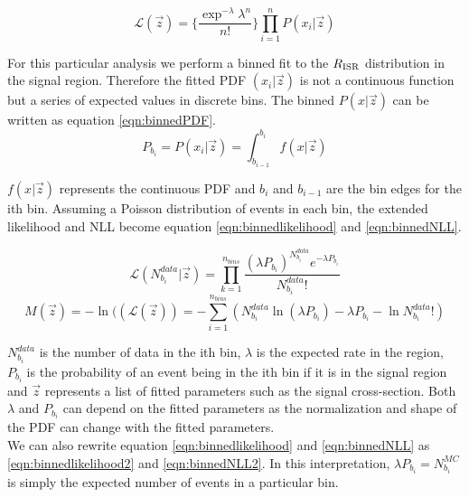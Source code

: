 \begin{equation}
\label{eqn:ExtLikelihood}
{\mathcal{L}}(\vec{z}) = \{ \frac{\exp^{-\lambda}{\lambda}^n}{n!} \}  {\displaystyle\prod_{i=1}^{n}} P(x_i|\vec{z})
\end{equation}

\indent For this particular analysis we perform a binned fit to the $R_{\mathrm{ISR}}$ distribution in the signal region.  Therefore the fitted PDF $(x_i|\vec{z})$ is not a continuous function but a series of expected values in discrete bins.  The binned $P(x|\vec{z})$ can be written as equation \ref{eqn:binnedPDF}. \\

\begin{equation}
\label{eqn:binnedPDF}
P_{b_i} = P(x_i|\vec{z}) = \int^{b_i}_{b_{i-1}} f(x|\vec{z})
\end{equation}

\indent $f(x|\vec{z})$ represents the continuous PDF and $b_i$ and $b_{i-1} $ are the bin edges for the ith bin. Assuming a Poisson distribution of events in each bin, the extended likelihood and NLL become equation \ref{eqn:binnedlikelihood} and \ref{eqn:binnedNLL}.

\begin{equation}
\label{eqn:binnedlikelihood}
{\mathcal{L}}(N^{data}_{b_i}|\vec{z}) = {\displaystyle\prod_{k=1}^{n_{bins}} \frac{({\lambda}P_{b_i})^{N^{data}_{b_i}}e^{-{\lambda}P_{b_i}}}{N^{data}_{b_i}!}} 
\end{equation}
\begin{equation}
\label{eqn:binnedNLL}
M(\vec{z})=-\ln(({\mathcal{L}}(\vec{z})) = -{\displaystyle\sum_{i=1}^{n_{bins}}} ( N^{data}_{b_i} \ln( {\lambda}P_{b_i} ) - {\lambda}P_{b_i} - \ln{N^{data}_{b_i}!} )
\end{equation}

\indent $N^{data}_{b_i}$ is the number of data in the ith bin, $\lambda$ is the expected rate in the region, $P_{b_i}$ is the probability of an event being in the ith bin if it is in the signal region and $\vec{z}$ represents a list of fitted parameters such as the signal cross-section.   Both $\lambda$ and $P_{b_i}$ can depend on the fitted parameters as the normalization and shape of the PDF can change with the fitted parameters. \\

\indent We can also rewrite  equation \ref{eqn:binnedlikelihood} and \ref{eqn:binnedNLL} as \ref{eqn:binnedlikelihood2} and \ref{eqn:binnedNLL2}.  In this interpretation, ${\lambda}P_{b_i}=N^{MC}_{b_i}$ is simply the expected number of events in a particular bin.  \\

